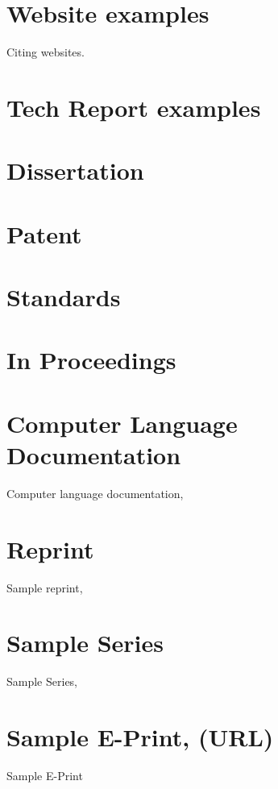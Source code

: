 \documentclass[preprint, NumberedRefs]{JASA}
\begin{document}
\section*{Website examples}

Citing websites\cite{website}.


\section*{Tech Report examples}
\cite{samptechreport3,samptechreport4}


\section*{Dissertation}
\cite{sampthesis}

\section*{Patent}

\cite{samppatent}

\section*{Standards}

\cite{sampstandards,sampstandards2}

\section*{In Proceedings}

 \cite{sampinproceedings2,
sampinproceedings3}

\section*{Computer Language Documentation}
Computer language documentation, 
\cite{sampcode,sampcode2}

\section*{Reprint}
Sample reprint, 
\cite{sampReprint}

\section*{Sample Series}
Sample Series, 
\cite{sampSeries}

\section*{Sample E-Print, (URL)}
 Sample E-Print 
\cite{sampEprint2}
\end{document}
